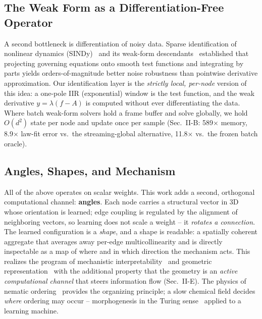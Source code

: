 \documentclass[conference]{IEEEtran}
\begin{document}
\subsection{The Weak Form as a Differentiation-Free Operator}
A second bottleneck is differentiation of noisy data. Sparse identification of
nonlinear dynamics (SINDy)~\cite{SINDy16} and its weak-form
descendants~\cite{WSINDy21,OWSINDy22} established that projecting governing equations
onto smooth test functions and integrating by parts yields orders-of-magnitude better
noise robustness than pointwise derivative approximation. Our identification layer is
the \emph{strictly local, per-node} version of this idea: a one-pole IIR (exponential)
window is the test function, and the weak derivative $y = \lambda(f - A)$ is computed
without ever differentiating the data. Where batch weak-form solvers hold a frame
buffer and solve globally, we hold $O(d^2)$ state per node and update once per sample
(Sec.~II-B: 589$\times$ memory, 8.9$\times$ law-fit error vs.\ the streaming-global
alternative, 11.8$\times$ vs.\ the frozen batch oracle).

\subsection{Angles, Shapes, and Mechanism}
All of the above operates on scalar weights. This work adds a second, orthogonal
computational channel: \textbf{angles}. Each node carries a structural vector in 3D
whose orientation is learned; edge coupling is regulated by the alignment of
neighboring vectors, so learning does not scale a weight -- it \emph{rotates a
connection}. The learned configuration is a \emph{shape}, and a shape is readable: a
spatially coherent aggregate that averages away per-edge multicollinearity and is
directly inspectable as a map of where and in which direction the mechanism acts. This
realizes the program of mechanistic interpretability~\cite{Olah20} and geometric
representation~\cite{Bronstein21} with the additional property that the geometry is an
\emph{active computational channel} that steers information flow (Sec.~II-E). The
physics of nematic ordering~\cite{dGP93} provides the organizing principle; a slow
chemical field decides \emph{where} ordering may occur -- morphogenesis in the Turing
sense~\cite{Turing52} applied to a learning machine.
\end{document}
